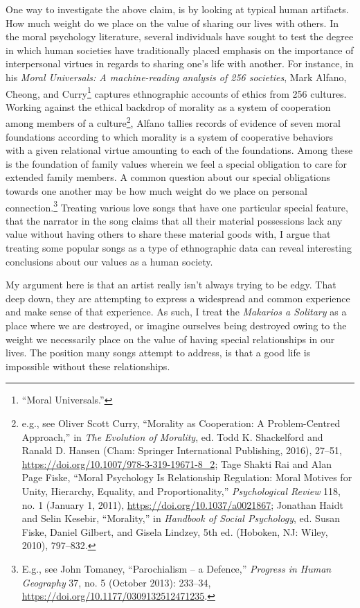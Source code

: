 \documentclass[phdthesis,12pt,final]{wuthesis}
\theoremstyle{definition}
\theoremstyle{definition}
\theoremstyle{definition}
\theoremstyle{definition}
\theoremstyle{remark}
\begin{document}
One way to investigate the above claim, is by looking at typical human artifacts. How much weight do we place on the value of sharing our lives with others. In the moral psychology literature, several individuals have sought to test the degree in which human societies have traditionally placed emphasis on the importance of interpersonal virtues in regards to sharing one's life with another. For instance, in his \emph{Moral Universals: A machine-reading analysis of 256 societies}, Mark Alfano, Cheong, and Curry\footnote{{``Moral {Universals}.''}} captures ethnographic accounts of ethics from 256 cultures. Working against the ethical backdrop of morality as a system of cooperation among members of a culture\footnote{e.g., see Oliver Scott Curry, {``Morality as {Cooperation}: {A Problem-Centred Approach},''} in \emph{The {Evolution} of {Morality}}, ed. Todd K. Shackelford and Ranald D. Hansen (Cham: Springer International Publishing, 2016), 27--51, \url{https://doi.org/10.1007/978-3-319-19671-8_2}; Tage Shakti Rai and Alan Page Fiske, {``Moral Psychology Is Relationship Regulation: Moral Motives for Unity, Hierarchy, Equality, and Proportionality,''} \emph{Psychological Review} 118, no. 1 (January 1, 2011), \url{https://doi.org/10.1037/a0021867}; Jonathan Haidt and Selin Kesebir, {``Morality,''} in \emph{Handbook of Social Psychology}, ed. Susan Fiske, Daniel Gilbert, and Gisela Lindzey, 5th ed. (Hoboken, NJ: Wiley, 2010), 797--832.}, Alfano tallies records of evidence of seven moral foundations according to which morality is a system of cooperative behaviors with a given relational virtue amounting to each of the foundations. Among these is the foundation of family values wherein we feel a special obligation to care for extended family members. A common question about our special obligations towards one another may be how much weight do we place on personal connection.\footnote{E.g., see John Tomaney, {``Parochialism -- a Defence,''} \emph{Progress in Human Geography} 37, no. 5 (October 2013): 233--34, \url{https://doi.org/10.1177/0309132512471235}.} Treating various love songs that have one particular special feature, that the narrator in the song claims that all their material possessions lack any value without having others to share these material goods with, I argue that treating some popular songs as a type of ethnographic data can reveal interesting conclusions about our values as a human society.

My argument here is that an artist really isn't always trying to be edgy. That deep down, they are attempting to express a widespread and common experience and make sense of that experience. As such, I treat the \emph{Makarios a Solitary} as a place where we are destroyed, or imagine ourselves being destroyed owing to the weight we necessarily place on the value of having special relationships in our lives. The position many songs attempt to address, is that a good life is impossible without these relationships.
\end{document}
